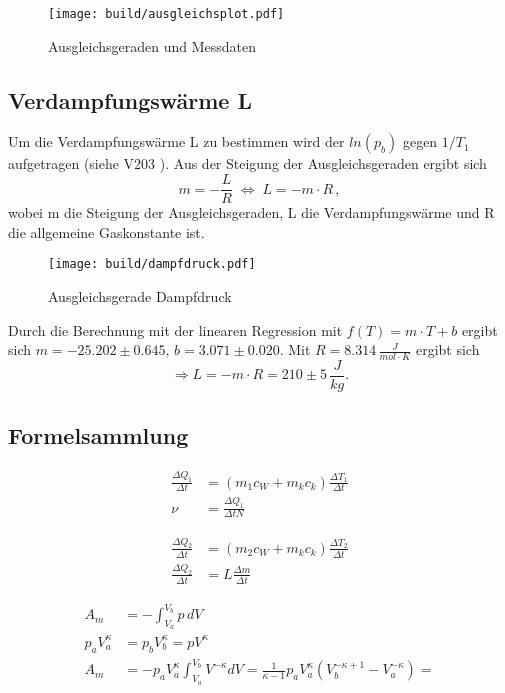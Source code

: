 \begin{figure}
  \centering
  \texttt{[image: build/ausgleichsplot.pdf]}
  \caption{Ausgleichsgeraden und Messdaten}
\end{figure}

\subsection{Verdampfungswärme L}
Um die Verdampfungswärme L zu bestimmen wird der $ln(p_b)$ gegen $1/T_1$ aufgetragen (siehe V203 \cite{V203}). Aus der Steigung der Ausgleichsgeraden ergibt sich
\begin{equation}
  m = -\frac{L}{R} \;\Leftrightarrow\; L = -m \cdot R\, ,
\end{equation}
wobei m die Steigung der Ausgleichsgeraden, L die Verdampfungswärme und R die allgemeine Gaskonstante ist.

\begin{figure}
  \centering
  \texttt{[image: build/dampfdruck.pdf]}
  \caption{Ausgleichsgerade Dampfdruck}
\end{figure}

Durch die Berechnung mit der linearen Regression mit $f(T) = m \cdot T + b$ ergibt sich $m = -25.202 \pm 0.645$, $b = 3.071 \pm 0.020$. Mit $R = 8.314 \, \unit{\frac{J}{mol \cdot K}}$ ergibt sich
\begin{equation}
  \Rightarrow L = -m \cdot R = 210 \pm 5 \, \unit{\frac{J}{kg}}.
\end{equation}

\subsection*{Formelsammlung}

\begin{align*}
  \frac{ΔQ_1}{Δt} &= \left(m_1c_W + m_kc_k\right)\frac{ΔT_1}{Δt}\\
  ν &= \frac{ΔQ_1}{ΔtN}
\end{align*}

\begin{align*}
 \frac{ΔQ_2}{Δt} &= \left(m_2c_W + m_kc_k\right)\frac{ΔT_2}{Δt}\\
 \frac{ΔQ_2}{Δt} &= L\frac{Δm}{Δt}
\end{align*}

\begin{align*}
  A_m &= -\int_{V_a}^{V_b}p \,dV\\
  p_aV_a^κ &= p_bV_b^κ = pV^\kappa\\
  A_m &= -p_aV_a^κ \int_{V_a}^{V_b} V^{-κ}dV = \frac{1}{κ - 1}p_aV_a^κ\left(V_b^{-κ+1} - V_a^{-κ}\right)
  = 
\end{align*}

